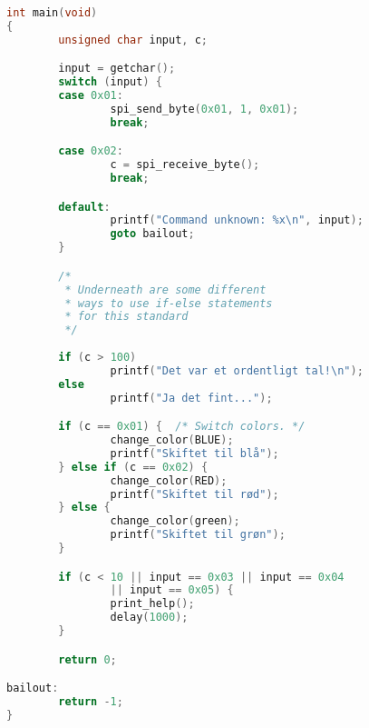 \documentclass[article, 10pt]{memoir}
\begin{document}
\begin{landscape}
\begin{multicols}{2}
\begin{lstlisting}[language=c]
int main(void)
{
        unsigned char input, c;

        input = getchar();
        switch (input) {
        case 0x01:
                spi_send_byte(0x01, 1, 0x01);
                break;

        case 0x02:
                c = spi_receive_byte();
                break;

        default:
                printf("Command unknown: %x\n", input);
                goto bailout;
        }

        /* 
         * Underneath are some different 
         * ways to use if-else statements
         * for this standard 
         */
    
        if (c > 100)
                printf("Det var et ordentligt tal!\n");
        else
                printf("Ja det fint...");

        if (c == 0x01) {  /* Switch colors. */
                change_color(BLUE);
                printf("Skiftet til blå");
        } else if (c == 0x02) {
                change_color(RED);
                printf("Skiftet til rød");
        } else {
                change_color(green);
                printf("Skiftet til grøn");
        }

        if (c < 10 || input == 0x03 || input == 0x04
                || input == 0x05) {
                print_help();
                delay(1000);
        }

        return 0;

bailout:
        return -1;
}
        \end{lstlisting}
    \end{multicols}
\end{landscape}
\end{document}
